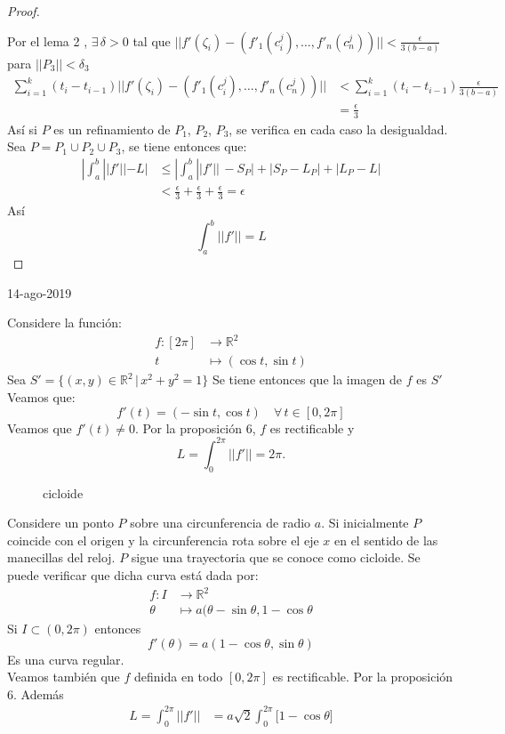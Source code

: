 \begin{proof}
\begin{align*}
                       \\
  \end{align*}
  Por el lema 2 , $\exists \, \delta>0$ tal que $||f'(\zeta_i) - (f'_1(c_i^j), 
  \ldots, f'_n(c_n^j))||<\frac{\epsilon}{3(b-a)}$ para $||P_3|| < \delta_3$
  \begin{align*}
    \sum_{i=1}^k(t_i- t_{i-1}) ||f'(\zeta_i) -(f'_1(c_i^j), \ldots, f'_n(c_n^j))|| 
  &< \sum_{i=1}^k(t_i- t_{i-1})\frac{\epsilon}{3(b-a)} \\
  &= \frac{\epsilon}{3}
  \end{align*}
  Así si $P$ es un refinamiento de $P_1$, $P_2$, $P_3$, se verifica en cada caso
  la desigualdad. Sea $P = P_1 \cup P_2 \cup P_3$, se tiene entonces que:
  \begin{align*}
    |\int_a^b ||f'|| - L| &\leq |\int_a^b ||f'||\, - S_P| + |S_P - L_P| + |L_P -
    L| \\
                          &< \frac{\epsilon}{3} + \frac{\epsilon}{3} +
                          \frac{\epsilon}{3} = \epsilon
  \end{align*}
  Así 
  \[
    \int_a^b ||f'|| = L
  \]
\end{proof}
14-ago-2019
\begin{example}
  Considere la función:
  \begin{align*}
    f:[2\pi] &\to \mathbb{R}^2 \\
    t &\mapsto (\cos t, \sin t)
  \end{align*}
  Sea $S' = \{(x,y) \in \mathbb{R}^2 \, | \, x^2 + y^2 = 1 \}$ Se tiene entonces
  que la imagen de $f$ es $S'$
  Veamos que:
  \[
    f'(t) = (-\sin t, \cos t) \quad \forall \, t \in [0, 2 \pi ]
  \]
  Veamos que $f'(t) \neq 0$. Por la proposición 6, $f$ es rectificable y 
  \[
    L =
    \int_0^{2\pi} || f ' || = 2\pi.
  \]
\end{example}
\begin{example}
  \begin{figure}[ht]
    \centering
    \caption{cicloide}
    \label{fig:cicloide}
  \end{figure}
  Considere un ponto $P$ sobre una circunferencia de radio $a$. Si inicialmente
  $P$ coincide con el origen y la circunferencia rota sobre el eje $x$ en el
  sentido de las manecillas del reloj. $P$ sigue una trayectoria que se conoce
  como cicloide. Se puede verificar que dicha curva está dada por:
  \begin{align*}
    f: I &\to \mathbb{R}^2 \\
    \theta &\mapsto a(\theta - \sin \theta, 1 - \cos \theta
  \end{align*}
  Si $I \subset (0, 2\pi)$ entonces 
  \[
    f'(\theta) = a (1-\cos \theta, \sin \theta)
  \]
  Es una curva regular.\\
  Veamos también que $f$ definida en todo $[0, 2\pi]$ es rectificable. Por la
  proposición 6. Además
  \begin{align*}
    L= \int_0^{2\pi} ||f'||&= a\sqrt{2}\int_0^{2\pi} \big[ 1-\cos \theta \big] 
  \end{align*}
\end{example}
